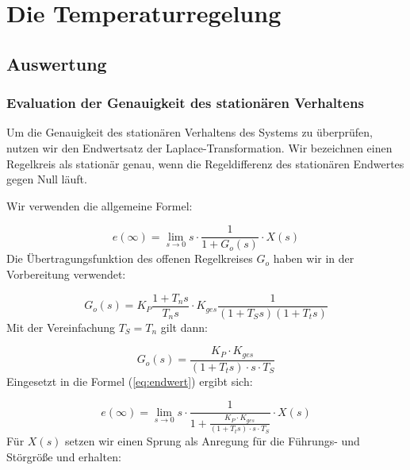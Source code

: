 \documentclass{report}
\begin{document}
\newpage


\tableofcontents

\listoffigures

\newpage

\chapter{Die Temperaturregelung}


\section{Auswertung}


\subsection{Evaluation der Genauigkeit des stationären Verhaltens}

Um die Genauigkeit des stationären Verhaltens des Systems zu überprüfen, nutzen wir den Endwertsatz der Laplace-Transformation. Wir bezeichnen einen Regelkreis als stationär genau, wenn die Regeldifferenz des stationären Endwertes gegen Null läuft.



\noindent
Wir verwenden die allgemeine Formel:

\begin{equation}
  \label{eq:endwert}
  e(\infty) = \lim_{s\to 0} s \cdot \frac{1}{1+G_{o}(s)}\cdot X(s)
\end{equation}
\noindent
Die Übertragungsfunktion des offenen Regelkreises $G_{o}$ haben wir in der Vorbereitung verwendet:

\begin{equation}
  \label{eq:1}
  G_{o}(s) = K_P\frac{1+T_ns}{T_ns}\cdot K_{ges}\frac{1}{(1+T_Ss)(1+T_ts)}
\end{equation}
\noindent
Mit der Vereinfachung $T_{S} = T_{n}$ gilt dann:

\begin{equation}
  \label{eq:3}
  G_{o}(s) = \frac{K_{P}\cdot K_{ges}}{(1+T_{t}s)\cdot s \cdot T_{S}}
\end{equation}
Eingesetzt in die Formel (\ref{eq:endwert}) ergibt sich:

\begin{equation}
  \label{eq:2}
  e(\infty) = \lim_{s\to 0} s \cdot \frac{1}{1+\frac{K_{P}\cdot K_{ges}}{(1+T_{t}s)\cdot s \cdot T_{S}}} \cdot X(s)
\end{equation}
Für $X(s)$ setzen wir einen Sprung als Anregung für die Führungs- und Störgröße und erhalten:
\end{document}
